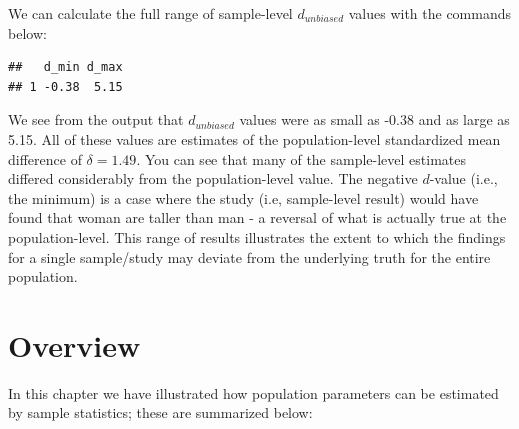\documentclass[
]{krantz}
\makeatletter
\newenvironment{Shaded}{\begin{snugshade}}{\end{snugshade}}
\newcommand{\DataTypeTok}[1]{\textcolor[rgb]{0.27,0.27,0.27}{#1}}
\newcommand{\KeywordTok}[1]{\textcolor[rgb]{0.27,0.27,0.27}{\textbf{#1}}}
\newcommand{\NormalTok}[1]{#1}
\newcommand{\OperatorTok}[1]{\textcolor[rgb]{0.43,0.43,0.43}{\textbf{#1}}}
\newcommand{\StringTok}[1]{\textcolor[rgb]{0.5,0.5,0.5}{#1}}
\newenvironment{kframe}{%
\medskip{}
\setlength{\fboxsep}{.8em}
 \def\at@end@of@kframe{}%
 \ifinner\ifhmode%
  \def\at@end@of@kframe{\end{minipage}}%
  \begin{minipage}{\columnwidth}%
 \fi\fi%
 \def\FrameCommand##1{\hskip\@totalleftmargin \hskip-\fboxsep
 \colorbox{shadecolor}{##1}\hskip-\fboxsep
     \hskip-\linewidth \hskip-\@totalleftmargin \hskip\columnwidth}%
 \MakeFramed {\advance\hsize-\width
   \@totalleftmargin\z@ \linewidth\hsize
   \@setminipage}}%
 {\par\unskip\endMakeFramed%
 \at@end@of@kframe}
\renewenvironment{Shaded}{\begin{kframe}}{\end{kframe}}
\makeatother
\begin{document}
We can calculate the full range of sample-level \(d_{unbiased}\) values with the commands below:

\begin{Shaded}
\end{Shaded}

\begin{verbatim}
##   d_min d_max
## 1 -0.38  5.15
\end{verbatim}

We see from the output that \(d_{unbiased}\) values were as small as -0.38 and as large as 5.15. All of these values are estimates of the population-level standardized mean difference of \(\delta = 1.49\). You can see that many of the sample-level estimates differed considerably from the population-level value. The negative \(d\)-value (i.e., the minimum) is a case where the study (i.e, sample-level result) would have found that woman are taller than man - a reversal of what is actually true at the population-level. This range of results illustrates the extent to which the findings for a single sample/study may deviate from the underlying truth for the entire population.

\hypertarget{overview-1}{%
\section{Overview}\label{overview-1}}

In this chapter we have illustrated how population parameters can be estimated by sample statistics; these are summarized below:

\doublespacing
\end{document}
